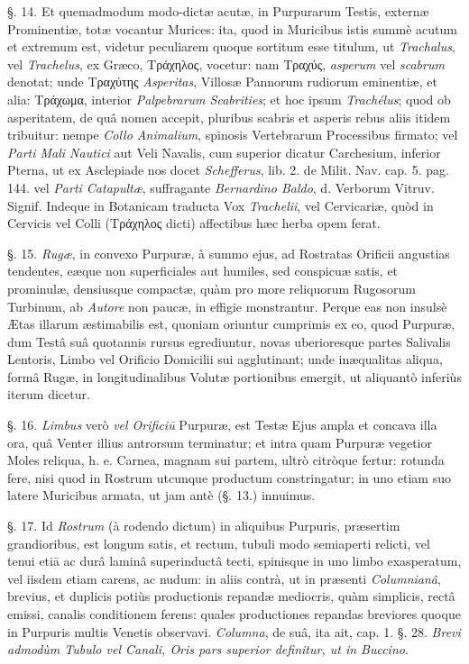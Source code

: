 \documentclass[a4paper, 11pt, oneside, polutonikogreek, german]{article}
\begin{document}
§. 14. Et quemadmodum modo-dictæ acutæ, in Purpurarum Testis, externæ Prominentiæ, totæ vocantur Murices: ita, quod in Muricibus istis summè acutum et extremum est, videtur peculiarem quoque sortitum esse titulum, ut \emph{Trachalus}, vel \emph{Trachelus}, ex Græco, Τράχηλος, vocetur: nam Τραχύς, \emph{asperum} vel \emph{scabrum} denotat; unde Τραχύτης \emph{Asperitas}, Villosæ Pannorum rudiorum eminentiæ, et alia: Τράχωμα, interior \emph{Palpebrarum Scabrities}; et hoc ipsum \emph{Trachélus}; quod ob asperitatem, de quâ nomen accepit, pluribus scabris et asperis rebus aliis itidem tribuitur: nempe \emph{Collo Animalium}, spinosis Vertebrarum Processibus firmato; vel \emph{Parti Mali Nautici} aut Veli Navalis, cum superior dicatur Carchesium, inferior Pterna, ut ex Asclepiade nos docet \emph{Schefferus}, lib. 2. de Milit. Nav. cap. 5. pag. 144. vel \emph{Parti Catapultæ}, suffragante \emph{Bernardino Baldo}, d. Verborum Vitruv. Signif. Indeque in Botanicam traducta Vox \emph{Trachelii}, vel Cervicariæ, quòd in Cervicis vel Colli (Τράχηλος dicti) affectibus hæc herba opem ferat.

§. 15. \emph{Rugæ}, in convexo Purpuræ, à summo ejus, ad Rostratas Orificii angustias tendentes, eæque non superficiales aut humiles, sed conspicuæ satis, et prominulæ, densiusque compactæ, quàm pro more reliquorum Rugosorum Turbinum, ab \emph{Autore} non paucæ, in effigie monstrantur. Perque eas non insulsè Ætas illarum æstimabilis est, quoniam oriuntur cumprimis ex eo, quod Purpuræ, dum Testâ suâ quotannis rursus egrediuntur, novas uberioresque partes Salivalis Lentoris, Limbo vel Orificio Domicilii sui agglutinant; unde inæqualitas aliqua, formâ Rugæ, in longitudinalibus Volutæ portionibus emergit, ut aliquantò inferiùs iterum dicetur.

§. 16. \emph{Limbus} verò \emph{vel Orificiū} Purpuræ, est Testæ Ejus ampla et concava illa ora, quâ Venter illius antrorsum terminatur; et intra quam Purpuræ vegetior Moles reliqua, h. e. Carnea, magnam sui partem, ultrò citròque fertur: rotunda fere, nisi quod in Rostrum utcunque productum constringatur; in uno etiam suo latere Muricibus armata, ut jam antè (§. 13.) innuimus.

§. 17. Id \emph{Rostrum} (à rodendo dictum) in aliquibus Purpuris, præsertim grandioribus, est longum satis, et rectum, tubuli modo semiaperti relicti, vel tenui etiā ac durâ laminâ superinductâ tecti, spinisque in uno limbo exasperatum, vel iisdem etiam carens, ac nudum: in aliis contrà, ut in præsenti \emph{Columnianâ}, brevius, et duplicis potiùs productionis repandæ mediocris, quàm simplicis, rectâ emissi, canalis conditionem ferens: quales productiones repandas breviores quoque in Purpuris multis Venetis observavi. \emph{Columna}, de suâ, ita ait, cap. 1. §. 28. \emph{Brevi admodùm Tubulo vel Canali, Oris pars superior definitur, ut in Buccino}.
\end{document}
